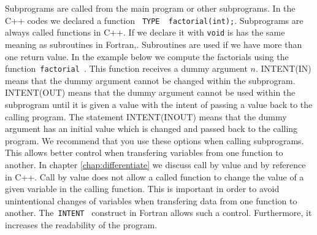 Subprograms are called from the main program or other subprograms. 
In the C++ codes we declared a function  \verb? TYPE  factorial(int);?.
Subprograms are always called functions in C++. If we declare it with \verb?void? is has the same
meaning as subroutines in Fortran,. Subroutines are used if we have more than one return value.
In the example below we compute the factorials using the 
function\verb? factorial ?. This function receives a dummy argument $n$. 
INTENT(IN) means that the dummy argument 
cannot be changed within the subprogram. 
INTENT(OUT) means that the dummy argument cannot 
be used within the subprogram until it
     is given a value with the intent of passing 
a value back to the calling program. The statement
INTENT(INOUT) means that the dummy argument 
has an initial value which is changed and
passed back to the calling program. We recommend that you use
these options when calling subprograms. This allows better control when transfering variables 
from one function to another. In chapter \ref{chap:differentiate} we discuss call by value and
by reference in C++. Call by value does not allow a called function to change the value
of a given variable in the calling function. This is important in order to avoid unintentional
changes of variables when transfering  data from one function to another. The\verb? INTENT ? 
construct in Fortran  allows such a control. Furthermore, it increases the readability of the program.
\lstset{language=[90]Fortran}
